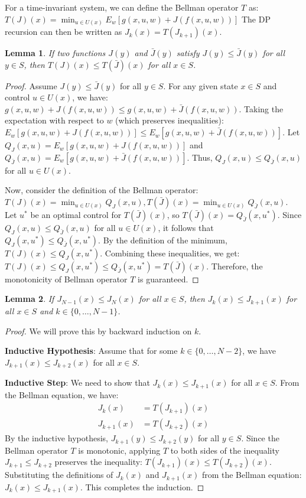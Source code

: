 \documentclass[11pt, a4paper, oneside]{memoir}
\newtheorem{lemma}{Lemma}
\begin{document}
For a time-invariant system, we can define the Bellman operator $T$ as:
$T(J)(x) = \min_{u \in U(x)} E_w[g(x, u, w) + J(f(x, u, w))]$
The DP recursion can then be written as $J_k(x) = T(J_{k+1})(x)$.

\begin{lemma}
  If two functions $J(y)$ and $\bar{J}(y)$ satisfy $J(y) \le \bar{J}(y)$ for all $y \in S$, then $T(J)(x) \le T(\bar{J})(x)$ for all $x \in S$.
\end{lemma}

\begin{proof}
  Assume $J(y) \le \bar{J}(y)$ for all $y \in S$.
  For any given state $x \in S$ and control $u \in U(x)$, we have:
  $g(x, u, w) + J(f(x, u, w)) \le g(x, u, w) + \bar{J}(f(x, u, w))$.
  Taking the expectation with respect to $w$ (which preserves inequalities):
  $E_w[g(x, u, w) + J(f(x, u, w))] \le E_w[g(x, u, w) + \bar{J}(f(x, u, w))]$.
  Let $Q_J(x, u) = E_w[g(x, u, w) + J(f(x, u, w))]$ and $Q_{\bar{J}}(x, u) = E_w[g(x, u, w) + \bar{J}(f(x, u, w))]$.
  Thus, $Q_J(x, u) \le Q_{\bar{J}}(x, u)$ for all $u \in U(x)$.

  Now, consider the definition of the Bellman operator:
  $T(J)(x) = \min_{u \in U(x)} Q_J(x, u),T(\bar{J})(x) = \min_{u \in U(x)} Q_{\bar{J}}(x, u)$.
  Let $u^*$ be an optimal control for $T(\bar{J})(x)$, so $T(\bar{J})(x) = Q_{\bar{J}}(x, u^*)$.
  Since $Q_J(x, u) \le Q_{\bar{J}}(x, u)$ for all $u \in U(x)$, it follows that $Q_J(x, u^*) \le Q_{\bar{J}}(x, u^*)$.
  By the definition of the minimum, $T(J)(x) \le Q_J(x, u^*)$.
  Combining these inequalities, we get:
  $T(J)(x) \le Q_J(x, u^*) \le Q_{\bar{J}}(x, u^*) = T(\bar{J})(x)$.
  Therefore, the monotonicity of Bellman operator $T$ is guaranteed.
\end{proof}

\begin{lemma}
  If $J_{N-1}(x) \le J_N(x)$ for all $x \in S$, then $J_k(x) \le J_{k+1}(x)$ for all $x \in S$ and $k \in \{0, \dots, N-1\}$.
\end{lemma}

\begin{proof}
  We will prove this by backward induction on $k$.

  \textbf{Inductive Hypothesis}:
  Assume that for some $k \in \{0, \dots, N-2\}$, we have $J_{k+1}(x) \le J_{k+2}(x)$ for all $x \in S$.

  \textbf{Inductive Step}:
  We need to show that $J_k(x) \le J_{k+1}(x)$ for all $x \in S$.
  From the Bellman equation, we have:
  \begin{align*}
    J_k(x)     & = T(J_{k+1})(x) \\
    J_{k+1}(x) & = T(J_{k+2})(x)
  \end{align*}
  By the inductive hypothesis, $J_{k+1}(y) \le J_{k+2}(y)$ for all $y \in S$.
  Since the Bellman operator $T$ is monotonic, applying $T$ to both sides of the inequality $J_{k+1} \le J_{k+2}$ preserves the inequality:
  $T(J_{k+1})(x) \le T(J_{k+2})(x)$.
  Substituting the definitions of $J_k(x)$ and $J_{k+1}(x)$ from the Bellman equation:
  $J_k(x) \le J_{k+1}(x)$.
  This completes the induction.
\end{proof}
\end{document}
